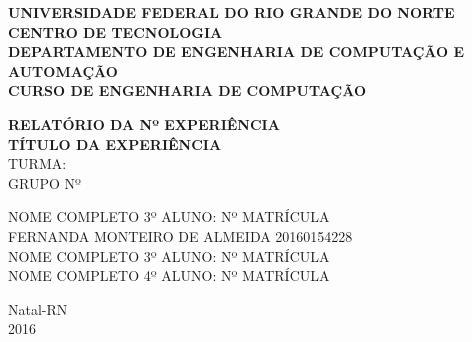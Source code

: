 \documentclass[a4paper,12pt]{article}
\begin{document}
\onehalfspacing

\thispagestyle{empty}

\setcounter{page}{1}


\begin{figure}[!ht]

\centering

\hspace{11.09cm}

\label{Logos}

\end{figure}


\vspace{-1cm}

\begin{center}
{\bf{\normalsize UNIVERSIDADE FEDERAL DO RIO GRANDE DO NORTE\\
CENTRO DE TECNOLOGIA\\
DEPARTAMENTO DE ENGENHARIA DE COMPUTAÇÃO E AUTOMAÇÃO\\
CURSO DE ENGENHARIA DE COMPUTAÇÃO
}}


\vspace{3.6cm}

{\bf{\large RELATÓRIO DA Nº EXPERIÊNCIA\\
TÍTULO DA EXPERIÊNCIA\\
}}
\vspace{1.5cm}
{\large TURMA: \\
	GRUPO Nº}

\vspace{3.6cm}



\begin{flushright}
\begin{normalsize}
NOME COMPLETO 3º ALUNO: Nº MATRÍCULA\\
\vspace{0.8cm}
FERNANDA MONTEIRO DE ALMEIDA 20160154228\\
\vspace{0.8cm}
NOME COMPLETO 3º ALUNO: Nº MATRÍCULA\\
\vspace{0.8cm}
NOME COMPLETO 4º ALUNO: Nº MATRÍCULA\\
\end{normalsize}
\end{flushright}


\vspace{2.5cm}

{\large Natal-RN\\
2016}

\end{center}
\end{document}
